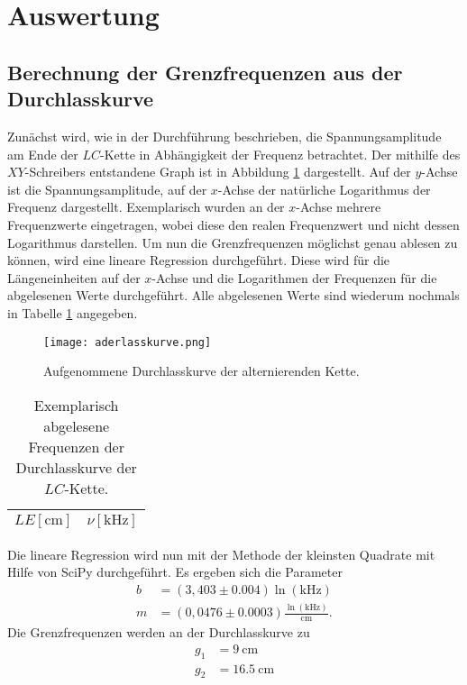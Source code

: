 \section{Auswertung}
\label{sec:Auswertung}
\subsection{Berechnung der Grenzfrequenzen aus der Durchlasskurve}
Zunächst wird, wie in der Durchführung beschrieben, die Spannungsamplitude am Ende der $LC$-Kette in Abhängigkeit der Frequenz betrachtet.
Der mithilfe des $XY$-Schreibers entstandene Graph ist in Abbildung \ref{fig:durchlass} dargestellt.
Auf der $y$-Achse ist die Spannungsamplitude, auf der $x$-Achse der natürliche Logarithmus der Frequenz dargestellt.
Exemplarisch wurden an der $x$-Achse mehrere Frequenzwerte eingetragen, wobei diese den realen Frequenzwert und nicht dessen Logarithmus darstellen.
Um nun die Grenzfrequenzen möglichst genau ablesen zu können, wird eine lineare Regression durchgeführt.
Diese wird für die Längeneinheiten auf der $x$-Achse und die Logarithmen der Frequenzen für die abgelesenen Werte durchgeführt.
Alle abgelesenen Werte sind wiederum nochmals in Tabelle \ref{tab:durchlass} angegeben.\\
\begin{figure}
  \centering
  \texttt{[image: aderlasskurve.png]}
  \caption{Aufgenommene Durchlasskurve der alternierenden Kette.}
  \label{fig:durchlass}
\end{figure}
\begin{table}
  \centering
  \caption{Exemplarisch abgelesene Frequenzen der Durchlasskurve der $LC$-Kette.}
  \label{tab:durchlass}
  \begin{tabular}{c c}
    \toprule
    {$LE [\si{\centi\metre}]$} & {$\nu [\si{\kilo\hertz}]$}\\
    \midrule
    
    \bottomrule
  \end{tabular}
\end{table}
Die lineare Regression wird nun mit der Methode der kleinsten Quadrate mit Hilfe von SciPy durchgeführt.
Es ergeben sich die Parameter
\begin{align*}
  b &= (3,403 \pm 0.004) \ln{( \si{\kilo\hertz} )} \\
  m &= (0,0476 \pm 0.0003) \frac{\ln( \si{\kilo\hertz}  )}{ \si{\centi\metre} }.
\end{align*}
Die Grenzfrequenzen werden an der Durchlasskurve zu
\begin{align*}
  g_1 &= \SI{9}{\centi\metre} \\
  g_2 &= \SI{16.5}{\centi\metre}
\end{align*}
